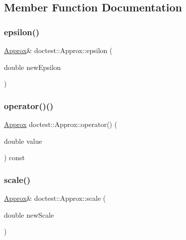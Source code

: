 \subsection{Member Function Documentation}
\mbox{\label{classdoctest_1_1_approx_af8df6b0af00fd875e5b6a0c30b86f636}} 
\subsubsection{\texorpdfstring{epsilon()}{epsilon()}}
{\footnotesize\ttfamily \hyperlink{classdoctest_1_1_approx}{Approx}\& doctest\+::\+Approx\+::epsilon (\begin{DoxyParamCaption}\item[{double}]{new\+Epsilon }\end{DoxyParamCaption})}

\mbox{\label{classdoctest_1_1_approx_aae907c5ea1c4ac94e134db9e35da7dce}} 
\subsubsection{\texorpdfstring{operator()()}{operator()()}}
{\footnotesize\ttfamily \hyperlink{classdoctest_1_1_approx}{Approx} doctest\+::\+Approx\+::operator() (\begin{DoxyParamCaption}\item[{double}]{value }\end{DoxyParamCaption}) const}

\mbox{\label{classdoctest_1_1_approx_a62185fd4c09a63dab61bd893574d8473}} 
\subsubsection{\texorpdfstring{scale()}{scale()}}
{\footnotesize\ttfamily \hyperlink{classdoctest_1_1_approx}{Approx}\& doctest\+::\+Approx\+::scale (\begin{DoxyParamCaption}\item[{double}]{new\+Scale }\end{DoxyParamCaption})}



